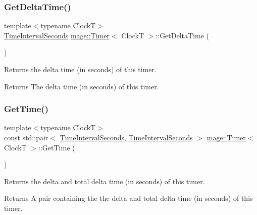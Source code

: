 \subsubsection{\texorpdfstring{Get\+Delta\+Time()}{GetDeltaTime()}}
{\footnotesize\ttfamily template$<$typename ClockT$>$ \\
\mbox{\hyperlink{namespacemage_a21c3d1575018d1e0720948713c76be1f}{Time\+Interval\+Seconds}} \mbox{\hyperlink{classmage_1_1_timer}{mage\+::\+Timer}}$<$ ClockT $>$\+::Get\+Delta\+Time (\begin{DoxyParamCaption}{ }\end{DoxyParamCaption})\hspace{0.3cm}{\ttfamily [noexcept]}}

Returns the delta time (in seconds) of this timer.

\begin{DoxyReturn}{Returns}
The delta time (in seconds) of this timer. 
\end{DoxyReturn}
\mbox{\label{classmage_1_1_timer_a5b8ce55b7225b43a59b591bc8734185f}} 
\subsubsection{\texorpdfstring{Get\+Time()}{GetTime()}}
{\footnotesize\ttfamily template$<$typename ClockT$>$ \\
const std\+::pair$<$ \mbox{\hyperlink{namespacemage_a21c3d1575018d1e0720948713c76be1f}{Time\+Interval\+Seconds}}, \mbox{\hyperlink{namespacemage_a21c3d1575018d1e0720948713c76be1f}{Time\+Interval\+Seconds}} $>$ \mbox{\hyperlink{classmage_1_1_timer}{mage\+::\+Timer}}$<$ ClockT $>$\+::Get\+Time (\begin{DoxyParamCaption}{ }\end{DoxyParamCaption})\hspace{0.3cm}{\ttfamily [noexcept]}}

Returns the delta and total delta time (in seconds) of this timer.

\begin{DoxyReturn}{Returns}
A pair containing the the delta and total delta time (in seconds) of this timer. 
\end{DoxyReturn}
\mbox{\label{classmage_1_1_timer_a3e46853855b650ee76ba789dbf2dafae}} 
